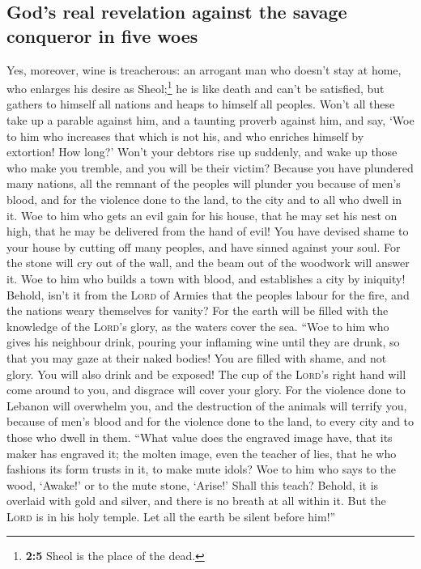 \hypertarget{gods-real-revelation-against-the-savage-conqueror-in-five-woes}{%
\subsection{God's real revelation against the savage conqueror in five
woes}\label{gods-real-revelation-against-the-savage-conqueror-in-five-woes}}

 Yes, moreover, wine is treacherous: an arrogant man who
doesn't stay at home, who enlarges his desire as Sheol;\footnote{\textbf{2:5}
  Sheol is the place of the dead.} he is like death and can't be
satisfied, but gathers to himself all nations and heaps to himself all
peoples.  Won't all these take up a parable against him,
and a taunting proverb against him, and say, `Woe to him who increases
that which is not his, and who enriches himself by extortion! How long?'
 Won't your debtors rise up suddenly, and wake up those
who make you tremble, and you will be their victim? 
Because you have plundered many nations, all the remnant of the peoples
will plunder you because of men's blood, and for the violence done to
the land, to the city and to all who dwell in it.  Woe to
him who gets an evil gain for his house, that he may set his nest on
high, that he may be delivered from the hand of evil! 
You have devised shame to your house by cutting off many peoples, and
have sinned against your soul.  For the stone will cry
out of the wall, and the beam out of the woodwork will answer it.
 Woe to him who builds a town with blood, and establishes
a city by iniquity!  Behold, isn't it from the
\textsc{Lord} of Armies that the peoples labour for the fire, and the
nations weary themselves for vanity?  For the earth will
be filled with the knowledge of the \textsc{Lord}'s glory, as the waters
cover the sea.  ``Woe to him who gives his neighbour
drink, pouring your inflaming wine until they are drunk, so that you may
gaze at their naked bodies!  You are filled with shame,
and not glory. You will also drink and be exposed! The cup of the
\textsc{Lord}'s right hand will come around to you, and disgrace will
cover your glory.  For the violence done to Lebanon will
overwhelm you, and the destruction of the animals will terrify you,
because of men's blood and for the violence done to the land, to every
city and to those who dwell in them.  ``What value does
the engraved image have, that its maker has engraved it; the molten
image, even the teacher of lies, that he who fashions its form trusts in
it, to make mute idols?  Woe to him who says to the wood,
`Awake!' or to the mute stone, `Arise!' Shall this teach? Behold, it is
overlaid with gold and silver, and there is no breath at all within it.
 But the \textsc{Lord} is in his holy temple. Let all the
earth be silent before him!''

